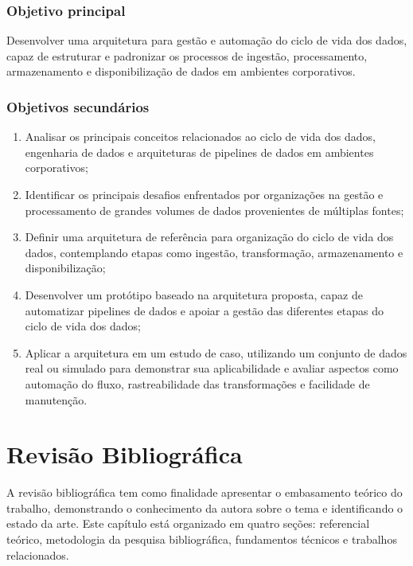 \documentclass[
    12pt,                %
    openright,           %
    oneside,             %
    a4paper,             %
    english,             %
    brazil               %
]{abntex2}
\begin{document}
\subsection{Objetivo principal}

Desenvolver uma arquitetura para gestão e automação do ciclo de vida dos dados, capaz de estruturar e padronizar os processos de ingestão, processamento, armazenamento e disponibilização de dados em ambientes corporativos.

\subsection{Objetivos secundários}

\begin{enumerate}
    \item Analisar os principais conceitos relacionados ao ciclo de vida dos dados, engenharia de dados e arquiteturas de pipelines de dados em ambientes corporativos;
    \item Identificar os principais desafios enfrentados por organizações na gestão e processamento de grandes volumes de dados provenientes de múltiplas fontes;
    \item Definir uma arquitetura de referência para organização do ciclo de vida dos dados, contemplando etapas como ingestão, transformação, armazenamento e disponibilização;
    \item Desenvolver um protótipo baseado na arquitetura proposta, capaz de automatizar pipelines de dados e apoiar a gestão das diferentes etapas do ciclo de vida dos dados;
    \item Aplicar a arquitetura em um estudo de caso, utilizando um conjunto de dados real ou simulado para demonstrar sua aplicabilidade e avaliar aspectos como automação do fluxo, rastreabilidade das transformações e facilidade de manutenção.
\end{enumerate}

\chapter{Revisão Bibliográfica}
\label{cap:revisao}

A revisão bibliográfica tem como finalidade apresentar o embasamento teórico do trabalho, demonstrando o conhecimento da autora sobre o tema e identificando o estado da arte. Este capítulo está organizado em quatro seções: referencial teórico, metodologia da pesquisa bibliográfica, fundamentos técnicos e trabalhos relacionados.
\end{document}
